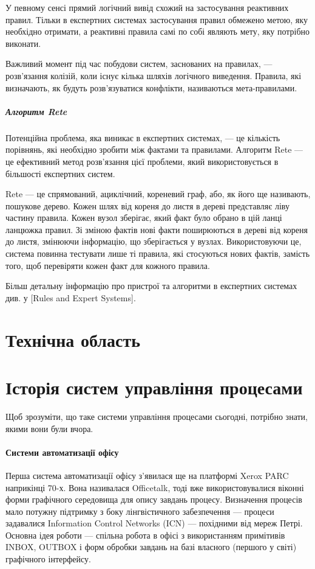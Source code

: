 \documentclass{memoir}
\begin{document}
У певному сенсі прямий логічний вивід схожий на застосування реактивних правил. Тільки в експертних системах застосування правил обмежено метою, яку необхідно отримати, а реактивні правила самі по собі являють мету, яку потрібно виконати.

Важливий момент під час побудови систем, заснованих на правилах, — розв’язання колізій, коли існує кілька шляхів логічного виведення. Правила, які визначають, як будуть розв’язуватися конфлікти, називаються мета-правилами.

\subparagraph{Алгоритм Rete}

Потенційна проблема, яка виникає в експертних системах, — це кількість порівнянь, які необхідно зробити між фактами та правилами. Алгоритм Rete — це ефективний метод розв’язання цієї проблеми, який використовується в більшості експертних систем.

Rete — це спрямований, ациклічний, кореневий граф, або, як його ще називають, пошукове дерево. Кожен шлях від кореня до листя в дереві представляє ліву частину правила. Кожен вузол зберігає, який факт було обрано в цій ланці ланцюжка правил. Зі зміною фактів нові факти поширюються в дереві від кореня до листя, змінюючи інформацію, що зберігається у вузлах. Використовуючи це, система повинна тестувати лише ті правила, які стосуються нових фактів, замість того, щоб перевіряти кожен факт для кожного правила.

Більш детальну інформацію про пристрої та алгоритми в експертних системах див. у [Rules and Expert Systems].

\section{Технічна область}

\section{Історія систем управління процесами}

Щоб зрозуміти, що таке системи управління процесами сьогодні, потрібно знати, якими вони були вчора.

\paragraph{Системи автоматизації офісу}

Перша система автоматизації офісу з’явилася ще на платформі Xerox PARC наприкінці 70-х. Вона називалася Officetalk, тоді вже використовувалися віконні форми графічного середовища для опису завдань процесу. Визначення процесів мало потужну підтримку з боку лінгвістичного забезпечення — процеси задавалися Information Control Networks (ICN) — похідними від мереж Петрі. Основна ідея роботи — спільна робота в офісі з використанням примітивів INBOX, OUTBOX і форм обробки завдань на базі власного (першого у світі) графічного інтерфейсу.
\end{document}
